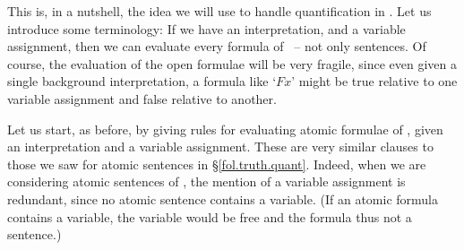 This is, in a nutshell, the idea we will use to handle quantification in \FOL. Let us introduce some terminology:   
If we have an interpretation, and a variable assignment, then we can evaluate every formula of \FOL\ – not only sentences. Of course, the evaluation of the open formulae will be very fragile, since even given a single background interpretation, a formula like `$Fx$' might be true relative to one variable assignment and false relative to another. 

Let us start, as before, by giving rules for evaluating atomic formulae of \FOL, given an interpretation and a variable assignment.  These are very similar clauses to those we saw for atomic sentences in §\ref{fol.truth.quant}. Indeed, when we are considering atomic sentences of \FOL, the mention of a variable assignment is redundant, since no atomic sentence contains a variable. (If an atomic formula contains a variable, the variable would be free and the formula thus not a sentence.)

